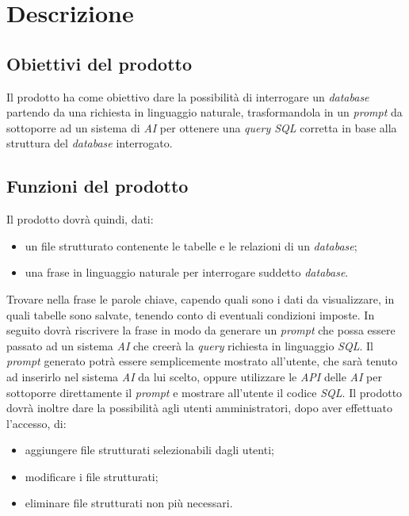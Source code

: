 \section{Descrizione}
\subsection{Obiettivi del prodotto}
Il prodotto ha come obiettivo dare la possibilità di interrogare un \textit{database} partendo da una richiesta in linguaggio naturale, trasformandola in un \textit{prompt} da sottoporre ad un sistema di \textit{AI} per ottenere una \textit{query SQL} corretta in base alla struttura del \textit{database} interrogato.

\subsection{Funzioni del prodotto}
Il prodotto dovrà quindi, dati:
\begin{itemize}
	\item un file strutturato contenente le tabelle e le relazioni di un \textit{database};
	\item una frase in linguaggio naturale per interrogare suddetto \textit{database}.
\end{itemize}
Trovare nella frase le parole chiave, capendo quali sono i dati da visualizzare, in quali tabelle sono salvate, tenendo conto di eventuali condizioni imposte.
In seguito dovrà riscrivere la frase in modo da generare un \textit{prompt} che possa essere passato ad un sistema \textit{AI} che creerà la \textit{query} richiesta in linguaggio \textit{SQL}.
Il \textit{prompt} generato potrà essere semplicemente mostrato all’utente, che sarà tenuto ad inserirlo nel sistema \textit{AI} da lui scelto, oppure utilizzare le \textit{API} delle \textit{AI} per sottoporre direttamente il \textit{prompt} e mostrare all’utente il codice \textit{SQL}.
Il prodotto dovrà inoltre dare la possibilità agli utenti amministratori, dopo aver effettuato l’accesso, di:
\begin{itemize}
	\item aggiungere file strutturati selezionabili dagli utenti;
	\item modificare i file strutturati;
	\item eliminare file strutturati non più necessari.
\end{itemize}